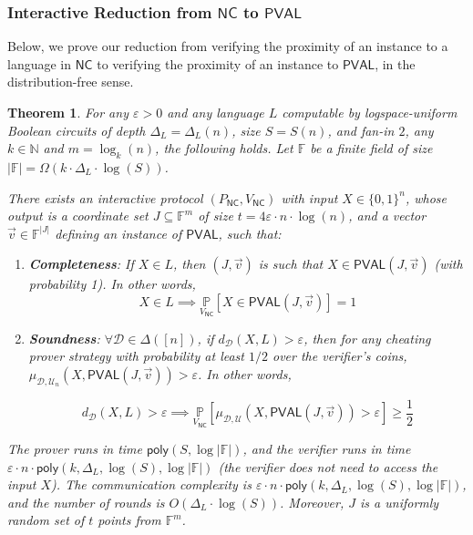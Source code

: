 \documentclass[10pt,a4paper]{article}
\newtheorem{theorem}{Theorem}[section]
\newcommand{\poly}{\mathsf{poly}}
\newcommand{\NC}{\mathsf{NC}}
\newcommand{\PVAL}{\mathsf{PVAL}}
\newcommand{\F}{\mathbb{F}}
\newcommand{\N}{\mathbb{N}}
\newcommand{\sD}{\mathcal{D}}
\begin{document}
\subsubsection{Interactive Reduction from $\NC$ to $\PVAL$}
\label{sec:df_nc_to_pval}
Below, we prove our reduction from verifying the proximity of an instance to a language in $\NC$ to verifying the proximity of an instance to $\PVAL$, in the distribution-free sense.
\begin{theorem}
\label{thm:df_nc_pval_reduction}
For any $\varepsilon>0$ and any language $L$ computable by logspace-uniform Boolean circuits of depth $\Delta_{L} = \Delta_{L}(n)$, size $S = S(n)$, and fan-in $2$, any $k \in \N$ and $m = \log_{k}(n)$, the following holds. Let $\F$ be a finite field of size $|\F|= \Omega( k\cdot\Delta_{L}\cdot \log (S))$. 

There exists an interactive protocol $(P_{\NC},V_{\NC})$ with input $X \in \{0,1\}^n$, whose output is a coordinate set $J \subseteq \mathbb{F}^{m}$ of size $t = 4\varepsilon \cdot n \cdot \log (n)$, and a vector $\vec{v} \in \mathbb{F}^{\vert J\vert }$ defining an instance of $\PVAL$, such that:
\begin{enumerate}
    \item \textbf{Completeness}: If $X \in L$, then $(J,\vec{v})$ is such that $X \in \PVAL(J,\vec{v})$ (with probability 1). In other words,
    \begin{equation*}
        X\in L\implies \underset{{V_{\NC}}}{\mathbb{P}}[X\in \PVAL(J,\Vec{v})]=1
    \end{equation*}
    
    \item \textbf{Soundness}: $\forall \sD\in\Delta([n])$, if $d_{\mathcal{D}}(X,L)>\varepsilon$, then for any cheating prover strategy with probability at least $1/2$ over the verifier's coins, $\mu_{\mathcal{D}, \mathcal{U}_{n}}(X,\PVAL(J,\vec{v})) > \varepsilon$. In other words,

    \begin{equation*}
        d_{\sD}(X,L)>\varepsilon \implies \underset{{V_{\NC}}}{\mathbb{P}}[\mu_{\sD,\mathcal{U}}(X, \PVAL(J,\Vec{v}))>\varepsilon]\geq \frac{1}{2}
    \end{equation*}
    
\end{enumerate}

The prover runs in time $\poly(S, \log |\F|)$, and the verifier runs in time $\varepsilon \cdot n \cdot \poly(k,\Delta_{L},\log (S),\log |\F|)$ (the verifier does not need to access the input $X$). The communication complexity is $\varepsilon \cdot n \cdot \poly(k,\Delta_{L}, \log (S), \log |\F|)$, and the number of rounds is $O(\Delta_{L} \cdot \log (S))$. Moreover, $J$ is a uniformly random set of $t$ points from $\F^m$.
\end{theorem}
\end{document}
